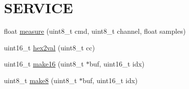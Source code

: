 \hypertarget{a00008}{\section{S\-E\-R\-V\-I\-C\-E}
\label{d4/dee/a00008}
}








  


\begin{DoxyCompactItemize}
\item 
float \hyperlink{a00008_gac914ebaa64afce03ee852af09659cf69}{measure} (uint8\-\_\-t cmd, uint8\-\_\-t channel, float samples)
\begin{DoxyCompactList}\small\item\em 

 \end{DoxyCompactList}\end{DoxyCompactItemize}
\begin{DoxyCompactItemize}
\item 
uint16\-\_\-t \hyperlink{a00008_gab120dc4bec6b4097a5cd3ebb91131c57}{hex2val} (uint8\-\_\-t cc)
\begin{DoxyCompactList}\small\item\em 

 \end{DoxyCompactList}\end{DoxyCompactItemize}
\begin{DoxyCompactItemize}
\item 
uint16\-\_\-t \hyperlink{a00008_ga1e74920f34a07a82cca58eab71ed12b3}{make16} (uint8\-\_\-t $\ast$buf, uint16\-\_\-t idx)
\begin{DoxyCompactList}\small\item\em 

 \end{DoxyCompactList}\end{DoxyCompactItemize}
\begin{DoxyCompactItemize}
\item 
uint8\-\_\-t \hyperlink{a00008_gaefa26c3e5b22ccbe5de1c33305f20e1b}{make8} (uint8\-\_\-t $\ast$buf, uint16\-\_\-t idx)
\begin{DoxyCompactList}\small\item\em 

 \end{DoxyCompactList}\end{DoxyCompactItemize}


